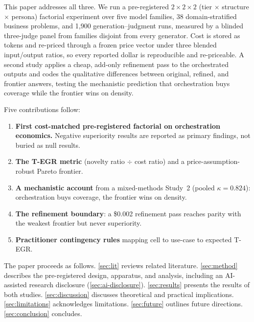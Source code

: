 \documentclass[12pt,a4paper]{article}
\begin{document}
This paper addresses all three. We run a pre-registered $2 \times 2 \times 2$
(tier $\times$ structure $\times$ persona) factorial experiment over five model
families, 38 domain-stratified business problems, and 1{,}900
generation--judgment runs, measured by a blinded three-judge panel from
families disjoint from every generator. Cost is stored as tokens and re-priced
through a frozen price vector under three blended input/output ratios, so every
reported dollar is reproducible and re-priceable. A second study applies a
cheap, add-only refinement pass to the orchestrated outputs and codes the
qualitative differences between original, refined, and frontier answers,
testing the mechanistic prediction that orchestration buys coverage while the
frontier wins on density.

Five contributions follow:
\begin{enumerate}[leftmargin=*,nosep]
  \item \textbf{First cost-matched pre-registered factorial on orchestration
        economics.} Negative superiority results are reported as primary
        findings, not buried as null results.
  \item \textbf{The T-EGR metric} (novelty ratio $\div$ cost ratio) and a
        price-assumption-robust Pareto frontier.
  \item \textbf{A mechanistic account} from a mixed-methods Study~2 (pooled
        $\kappa = 0.824$): orchestration buys coverage, the frontier wins on
        density.
  \item \textbf{The refinement boundary}: a \$0.002 refinement pass reaches
        parity with the weakest frontier but never superiority.
  \item \textbf{Practitioner contingency rules} mapping cell to use-case to
        expected T-EGR.
\end{enumerate}

The paper proceeds as follows. \cref{sec:lit} reviews related literature.
\cref{sec:method} describes the pre-registered design, apparatus, and analysis,
including an AI-assisted research disclosure (\cref{sec:ai-disclosure}).
\cref{sec:results} presents the results of both studies. \cref{sec:discussion}
discusses theoretical and practical implications. \cref{sec:limitations}
acknowledges limitations. \cref{sec:future} outlines future directions.
\cref{sec:conclusion} concludes.

\end{document}
